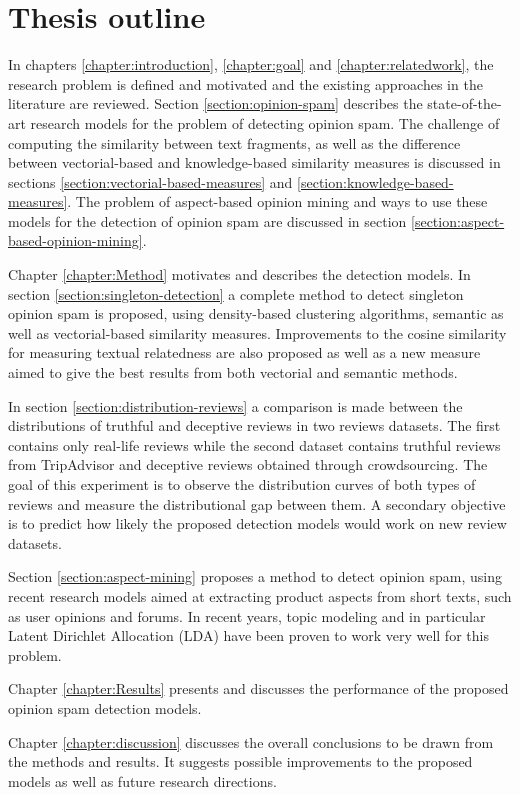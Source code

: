 \section{Thesis outline}

In chapters \ref{chapter:introduction}, \ref{chapter:goal} and \ref{chapter:relatedwork}, the research problem is defined and motivated and the existing approaches in the literature are reviewed. Section \ref{section:opinion-spam} describes the state-of-the-art research models for the problem of detecting opinion spam. The challenge of computing the similarity between text fragments, as well as the difference between vectorial-based and knowledge-based similarity measures is discussed in sections \ref{section:vectorial-based-measures} and \ref{section:knowledge-based-measures}. The problem of aspect-based opinion mining and ways to use these models for the detection of opinion spam are discussed in section \ref{section:aspect-based-opinion-mining}.

Chapter \ref{chapter:Method} motivates and describes the detection models. In section \ref{section:singleton-detection} a complete method to detect singleton opinion spam is proposed, using density-based clustering algorithms, semantic as well as vectorial-based similarity measures. Improvements to the cosine similarity for measuring textual relatedness are also proposed as well as a new measure aimed to give the best results from both vectorial and semantic methods. 

In section \ref{section:distribution-reviews} a comparison is made between the distributions of truthful and deceptive reviews in two reviews datasets. The first contains only real-life reviews while the second dataset contains truthful reviews from TripAdvisor and deceptive reviews obtained through crowdsourcing. The goal of this experiment is to observe the distribution curves of both types of reviews and measure the distributional gap between them. A secondary objective is to predict how likely the proposed detection models would work on new review datasets.

Section \ref{section:aspect-mining} proposes a method to detect opinion spam, using recent research models aimed at extracting product aspects from short texts, such as user opinions and forums. In recent years, topic modeling and in particular Latent Dirichlet Allocation (LDA) have been proven to work very well for this problem.

Chapter \ref{chapter:Results} presents and discusses the performance of the proposed opinion spam detection models.

Chapter \ref{chapter:discussion} discusses the overall conclusions to be drawn from the methods and results. It suggests possible improvements to the proposed models as well as future research directions.